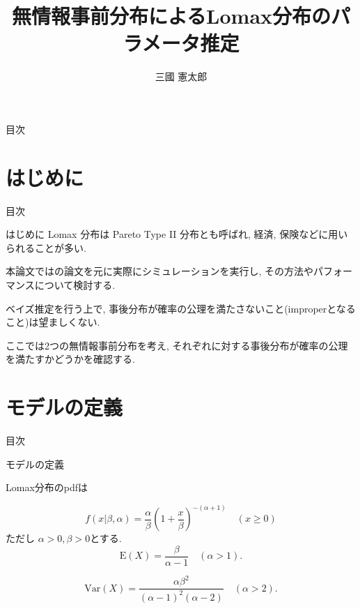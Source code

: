 \documentclass[12pt,dvipdfmx]{beamer}
\title{無情報事前分布によるLomax分布のパラメータ推定}
\author{三國 憲太郎}
\institute{東京理科大学 黒沢研究室}
\begin{document}
\begin{frame}
\titlepage
\thispagestyle{empty}
\end{frame}

\begin{frame}
{\large 目次}
\tableofcontents
\end{frame}




\section{はじめに}

\begin{frame}
{\large 目次}
\tableofcontents[currentsection]
\end{frame}

\begin{frame}{はじめに}
Lomax 分布は Pareto Type II 分布とも呼ばれ, 経済, 保険などに用いられることが多い. 

本論文では\cite{Lomax2020}の論文を元に実際にシミュレーションを実行し, その方法やパフォーマンスについて検討する.



\end{frame}



\begin{frame}

ベイズ推定を行う上で, 事後分布が確率の公理を満たさないこと(improperとなること)は望ましくない.

ここでは2つの無情報事前分布を考え, それぞれに対する事後分布が確率の公理を満たすかどうかを確認する.


\end{frame}



\section{モデルの定義}

\begin{frame}
{\large 目次}
\tableofcontents[currentsection]
\end{frame}

\begin{frame}{モデルの定義}

Lomax分布のpdfは

\begin{equation}\label{lomax pdf}
f(x|\beta ,\alpha )
=
\frac{\alpha}{\beta}
\left( 
1+\frac{x}{\beta }
\right)
^{-(\alpha +1)}
\quad (x \geq 0)
\end{equation}
ただし $\alpha > 0, \beta > 0$とする.
$$
\mbox{E}(X) = \frac{\beta }{\alpha -1} \quad (\alpha >1). 
$$

$$
\mbox{Var}(X) = \frac{\alpha \beta ^{2}}{(\alpha -1)^{2}(\alpha -2)} \quad (\alpha >2).
$$


\end{frame}
\end{document}
